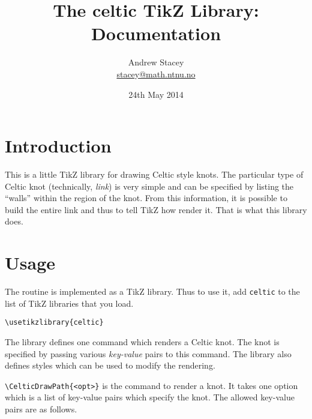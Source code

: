 \documentclass{ltxdoc}
\title{The \textsf{celtic} TikZ Library: Documentation}
\author{Andrew Stacey \\ \url{stacey@math.ntnu.no}}
\date{24th May 2014}
\begin{document}
\VerbatimFootnotes
\maketitle

\begin{center}
\end{center}

\section{Introduction}

This is a little TikZ library for drawing Celtic style knots.
The particular type of Celtic knot (technically, \emph{link}) is very simple and can be specified by listing the ``walls'' within the region of the knot.
From this information, it is possible to build the entire link and thus to tell TikZ how render it.
That is what this library does.

\section{Usage}

The routine is implemented as a TikZ library.
Thus to use it, add \Verb+celtic+ to the list of TikZ libraries that you load.

\begin{verbatim}
\usetikzlibrary{celtic}
\end{verbatim}

The library defines one command which renders a Celtic knot.
The knot is specified by passing various \emph{key-value} pairs to this command.
The library also defines styles which can be used to modify the rendering.

\DescribeMacro{\CelticDrawPath}\Verb+\CelticDrawPath{<opt>}+ is the command to render a knot.
It takes one option which is a list of key-value pairs which specify the knot.
The allowed key-value pairs are as follows.
\end{document}
